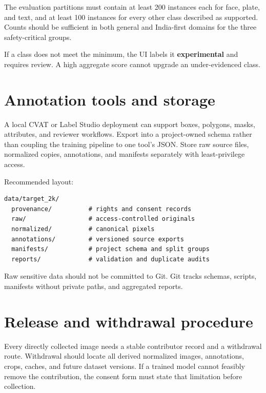 The evaluation partitions must contain at least 200 instances each for face, plate, and text, and at least 100 instances for every other class described as supported. Counts should be sufficient in both general and India-first domains for the three safety-critical groups.

If a class does not meet the minimum, the UI labels it \textbf{experimental} and requires review. A high aggregate score cannot upgrade an under-evidenced class.

\section{Annotation tools and storage}

A local CVAT or Label Studio deployment can support boxes, polygons, masks, attributes, and reviewer workflows. Export into a project-owned schema rather than coupling the training pipeline to one tool's JSON. Store raw source files, normalized copies, annotations, and manifests separately with least-privilege access.

Recommended layout:

\begin{lstlisting}[language={}]
data/target_2k/
  provenance/          # rights and consent records
  raw/                 # access-controlled originals
  normalized/          # canonical pixels
  annotations/         # versioned source exports
  manifests/           # project schema and split groups
  reports/             # validation and duplicate audits
\end{lstlisting}

Raw sensitive data should not be committed to Git. Git tracks schemas, scripts, manifests without private paths, and aggregated reports.

\section{Release and withdrawal procedure}

Every directly collected image needs a stable contributor record and a withdrawal route. Withdrawal should locate all derived normalized images, annotations, crops, caches, and future dataset versions. If a trained model cannot feasibly remove the contribution, the consent form must state that limitation before collection.
